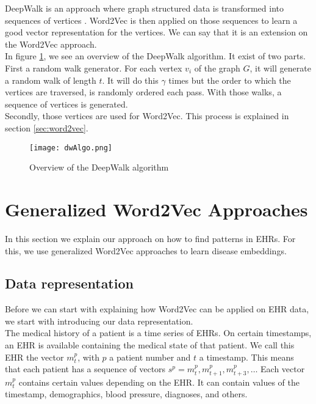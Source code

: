 DeepWalk is an approach where graph structured data is transformed into sequences of vertices \cite{deepwalkMain:article}. Word2Vec is then applied on those sequences to learn a good vector representation for the vertices. We can say that it is an extension on the Word2Vec approach. \\

In figure \ref{fig:dwAlgo}, we see an overview of the DeepWalk algorithm. It exist of two parts. \\
First a random walk generator. For each vertex $v_i$ of the graph $G$, it will generate a random walk of length $t$. It will do this $\gamma$ times but the order to which the vertices are traversed, is randomly ordered each pass. With those walks, a sequence of vertices is generated. \\
Secondly, those vertices are used for Word2Vec. This process is explained in section \ref{sec:word2vec}.

\begin{figure}[!htb]
	\centering
	\texttt{[image: dwAlgo.png]}
	\caption{Overview of the DeepWalk algorithm \cite{deepwalkMain:article}}
	\label{fig:dwAlgo}
\end{figure} 

\section{Generalized Word2Vec Approaches}
\label{sec:gw2v}

In this section we explain our approach on how to find patterns in EHRs. For this, we use generalized Word2Vec approaches to learn disease embeddings. 

\subsection{Data representation}

Before we can start with explaining how Word2Vec can be applied on EHR data, we start with introducing our data representation. \\
The medical history of a patient is a time series of EHRs. On certain timestamps, an EHR is available containing the medical state of that patient. We call this EHR the vector $m^p_t$, with $p$ a patient number and $t$ a timestamp. This means that each patient has a sequence of vectors $s^p = m^p_t, m^p_{t+1}, m^p_{t+3}, \ldots$ Each vector $m^p_t$ contains certain values depending on the EHR. It can contain values of the timestamp, demographics, blood pressure, diagnoses, and others. 

